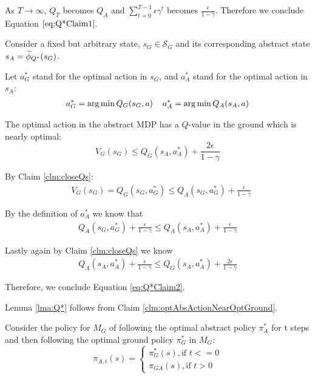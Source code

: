 As $T \rightarrow \infty$, $Q_T$ becomes $Q_A$ and $\sum_{t=0}^{T-1} \epsilon \gamma^t$ becomes $\frac{\epsilon}{1-\gamma}$. Therefore we conclude Equation $\ref{eq:Q*Claim1}$. \\

\begin{clm}
\label{clm:optAbsActionNearOptGround}

Consider a fixed but arbitrary state, $s_G \in \mathcal{S}_G$ and its corresponding abstract state $s_A=\widetilde \phi_{Q^*}(s_G)$.

Let $a^*_G$ stand for the optimal action in $s_G$, and $a^*_A$ stand for the optimal action in $s_A$:
\begin{align*}
a^*_G = \operatorname*{arg\,min} Q_G(s_G, a) \hspace{4mm}
a^*_A = \operatorname*{arg\,min} Q_A(s_A, a)
\end{align*}

The optimal action in the abstract MDP has a $Q$-value in the ground which is nearly optimal:
\begin{equation}
\label{eq:Q*Claim2}
V_G(s_G) \leq Q_G(s_A, a^*_A) + \frac{2\epsilon}{1-\gamma}
\end{equation}
\end{clm}

By Claim \ref{clm:closeQs}:
\begin{align}
&V_G(s_G) = Q_G(s_G, a^*_G) \leq Q_A(s_G, a^*_G) + \frac{\epsilon}{1-\gamma}
\label{eq:Q*OptActionResult}
\end{align}

By the definition of $a^*_A$ we know that 
\begin{align}
Q_A(s_G, a^*_G) + \frac{\epsilon}{1-\gamma} \leq Q_A(s_A, a^*_A) + \frac{\epsilon}{1-\gamma}
\end{align}

Lastly again by Claim \ref{clm:closeQs} we know
\begin{align}
Q_A(s_A, a^*_A) + \frac{\epsilon}{1-\gamma} \leq Q_G(s_A, a^*_A) + \frac{2\epsilon}{1-\gamma}
\end{align}

Therefore, we conclude Equation \ref{eq:Q*Claim2}.

\begin{clm}
Lemma \ref{lma:Q*} follows from Claim \ref{clm:optAbsActionNearOptGround}.
\end{clm}

Consider the policy for $M_G$ of following the optimal abstract policy $\pi^*_A$ for t steps and then following the optimal ground policy $\pi^*_G$ in $M_G$:
\begin{equation}
\pi_{A,t}(s)=
\begin{cases}
\pi_G^*(s), \text{if $t<=0$}\\
\pi_{GA}(s), \text{if $t > 0$}
\end{cases}
\end{equation}


